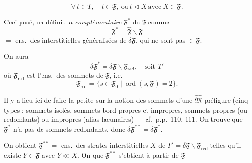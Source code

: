 \documentclass[11pt,a4paper]{article}
\begin{document}
\[
  \forall\, t \in T, \quad t \in \mathfrak{F}, \ \text{ou} \ t \lhd X \ \text{avec} \ X \in \mathfrak{F} .
\]


Ceci posé, on définit la  \emph{complémentaire} $\mathfrak{F}^{*}$ de $\mathfrak{F}$ comme
\[
  \mathfrak{F}^{*} = \widehat{\mathfrak{F}} \smallsetminus \mathfrak{F}
\]
$=$ ens.\ des   interstitielles généralisées de $\delta\mathfrak{F}$, qui ne sont pas $\in \mathfrak{F}$.

On aura
\[
  \delta \mathfrak{F}^{*} = \delta \mathfrak{F} \smallsetminus \mathfrak{F}_{\mathrm{red}} , \quad \text{soit } T'
\]
où $\mathfrak{F}_{\mathrm{red}}$ est l'ens.\ des sommets  de $\mathfrak{F}$, i.e.
\[
  \mathfrak{F}_{\mathrm{red}} = \{ s \in \mathfrak{F}_0 \mid \operatorname{ord}(s, \mathfrak{F}) = 2 \} .
\]

 Il y a lieu ici de faire la petite  sur la notion des sommets  d'une $\widehat{\mathfrak{M}}$-préfigure (cinq types : sommets isolés, sommets-bord propres et impropres, sommets  propres (ou redondants) ou impropres (alias lacunaires) --- cf.\ p.p.~110, 111. On trouve   que $\mathfrak{F}^{*}$ n'a pas de sommets redondants, donc $\delta\mathfrak{F}^{**} = \delta\mathfrak{F}^{*}$.

On obtient
$\mathfrak{F}^{**} = $ ens.\ des strates interstitielles $X$ de $T' = \delta\mathfrak{F} \smallsetminus \mathfrak{F}_{\mathrm{red}}$ telles qu'il existe \struck{\ill{}} $Y \in \mathfrak{F}$ avec $Y \ll X$.
On  que $\mathfrak{F}^{**}$ s'obtient à partir de $\mathfrak{F}$

\end{document}
